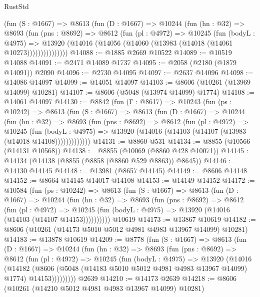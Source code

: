 \begin{lexlean}{RustStd}
\begin{coremodule}
          (fun (S : @1667) =>
          @8613
            (fun (D : @1667) =>
            @10244
              (fun (hn : @32) =>
              @8693
                (fun (pns : @8692) =>
                @8612
                  (fun (pl : @4972) =>
                  @10245
                    (fun (bodyL : @4975) =>
                    @13920 (@14016 (@14056 (@14060 (@13983 (@14018 (@14061 @10273)))))))))))))))
@14088 := @1885 @2669 @10522
@14089 := @10519 @14088
@14091 := @2471 @14089 @1737
@14095 := @2058 (@2180 (@1879 @14091)) @2090
@14096 := @2730 @14095
@14097 := @2637 @14096
@14098 := @14086 @14097
@14099 := @14051 @14097
@14103 := @8606 (@10261 (@13969 @14099) @10281)
@14107 := @8606 (@5048 (@13974 @14099) @1774)
@14108 := @14061 @14097
@14130 := @8842
    (fun (Γ : @8617) =>
    @10243
      (fun (ps : @10242) =>
      @8613
        (fun (S : @1667) =>
        @8613
          (fun (D : @1667) =>
          @10244
            (fun (hn : @32) =>
            @8693
              (fun (pns : @8692) =>
              @8612
                (fun (pl : @4972) =>
                @10245
                  (fun (bodyL : @4975) =>
                  @13920 (@14016 (@14103 (@14107 (@13983 (@14018 @14108)))))))))))))
@14131 := @8860 @531
@14134 := @8855 (@10566 (@14131 @10568))
@14138 := @8855 (@10069 (@8860 @428 @10071))
@14145 := @14134 (@14138 (@8855 (@8858 (@8860 @529 @8863)) @8645))
@14146 := @14130 @14145
@14148 := @13981 (@8657 @14145)
@14149 := @8606 @14148
@14152 := @8664 @14145 @14017 @14108
@14153 := @14149 @14152
@14172 := @10584
    (fun (ps : @10242) =>
    @8613
      (fun (S : @1667) =>
      @8613
        (fun (D : @1667) =>
        @10244
          (fun (hn : @32) =>
          @8693
            (fun (pns : @8692) =>
            @8612
              (fun (pl : @4972) =>
              @10245 (fun (bodyL : @4975) => @13920 (@14016 (@14103 (@14107 @14153))))))))))
    @10619
@14173 := @13867 @10619
@14182 := @8606 (@10261 (@14173 @5010 @5012 @4981 @4983 @13967 @14099) @10281)
@14183 := @13878 @10619
@14209 := @8778
    (fun (S : @1667) =>
    @8613
      (fun (D : @1667) =>
      @10244
        (fun (hn : @32) =>
        @8693
          (fun (pns : @8692) =>
          @8612
            (fun (pl : @4972) =>
            @10245
              (fun (bodyL : @4975) =>
              @13920
                (@14016
                  (@14182
                    (@8606
                      (@5048 (@14183 @5010 @5012 @4981 @4983 @13967 @14099) @1774)
                      @14153)))))))))
    @2639
@14210 := @14173 @2639
@14218 := @8606 (@10261 (@14210 @5012 @4981 @4983 @13967 @14099) @10281)

\end{coremodule}
\end{lexlean}
